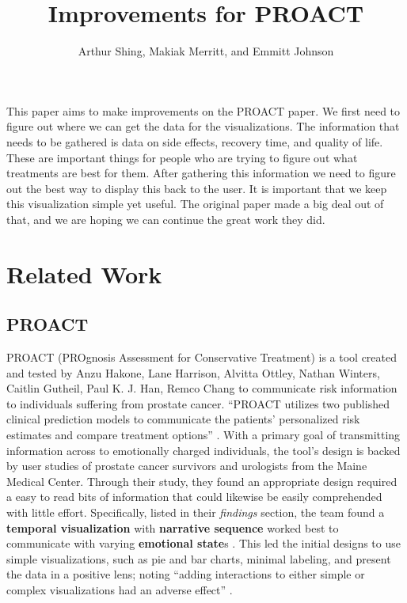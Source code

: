 \documentclass[journal]{vgtc}                %
\title{Improvements for PROACT}
\author{Arthur Shing, Makiak Merritt, and Emmitt Johnson}
\begin{document}


\maketitle

This paper aims to make improvements on the PROACT paper. We first need to figure out where we can get the data for the visualizations. The information that needs to be gathered is data on side effects, recovery time, and quality of life. These are important things for people who are trying to figure out what treatments are best for them. After gathering this information we need to figure out the best way to display this back to the user. It is important that we keep this visualization simple yet useful. The original paper made a big deal out of that, and we are hoping we can continue the great work they did. 
\section{Related Work}
\subsection{PROACT}
PROACT (PROgnosis Assessment for Conservative Treatment) is a tool created and tested by Anzu Hakone, Lane Harrison, Alvitta Ottley, Nathan Winters, Caitlin Gutheil, Paul K. J. Han, Remco Chang to communicate risk information to individuals suffering from prostate cancer.
``PROACT utilizes two published clinical prediction models to communicate the patients’ personalized risk estimates and compare treatment options'' \cite[p.~1]{PROACT:2016}.
With a primary goal of transmitting information across to emotionally charged individuals, the tool's design is backed by user studies of prostate cancer survivors and urologists from the Maine Medical Center.
Through their study, they found an appropriate design required a easy to read bits of information that could likewise be easily comprehended with little effort.
Specifically, listed in their \textit{findings} section, the team found a \textbf{temporal visualization} with \textbf{narrative sequence} worked best to communicate with varying \textbf{emotional state}s \cite[p.~8]{PROACT:2016}.
This led the initial designs to use simple visualizations, such as pie and bar charts, minimal labeling, and present the data in a positive lens; noting ``adding interactions to either simple or complex visualizations had an adverse effect'' \cite[p.~2]{PROACT:2016}.
\end{document}
